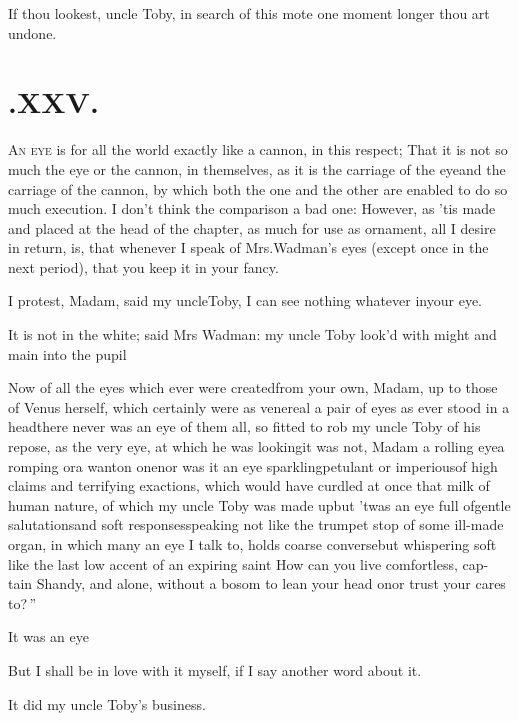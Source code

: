\documentclass{article}
\begin{document}
\tsh If thou lookest, uncle Toby, in\break
search of this mote one moment longer\break
\tsh thou art undone.


\section{.\enspace XXV.}

\lettrine{A}{n eye} is for all the world exactly like a cannon, in this respect;
That it is not so much the eye or the cannon, in themselves, as it is the carriage
of the eye\tsh and the carriage of the cannon, by which both the one and the other
are enabled to do so much execution. I don’t think the comparison a bad one:
However, as ’tis made and placed at the head of the chapter, as much for use as
ornament, all I desire in return, is, that whenever I speak of Mrs.\@ Wadman’s eyes
(except once in the next period), that you keep it in your fancy.

I protest, Madam, said my uncle\break Toby, I can see nothing
whatever in\break your eye.

It is not in the white; said Mrs Wadman: my uncle
Toby look’d with might and main into the
pupil\tsh

Now of all the eyes which ever were created\tsh from
your own, Madam, up to those of Venus herself, which
certainly were as venereal a pair of eyes as ever stood in a
head\tsh there never was an eye of them all, so fitted to
rob my uncle Toby of his repose, as the very eye, at which
he was looking\tsh it was not, Madam a rolling
eye\tsh a romping or\break a wanton one\tsk nor was it an eye
spark\-ling\tsk petulant or imperious\tsk of high claims and
terrifying exactions, which would have curdled at once that milk of human
nature, of which my uncle Toby was made up\tsh but
’twas an eye full of\break gentle salutations\tsh and soft
responses\break\tsh speaking \tsh not like the trumpet\break
stop of some ill-made organ, in which many an eye I talk to, holds
coarse converse\tsh but whispering soft \tsh like
the last low accent of an expiring
saint\tsh\break 
\lqq How can you live comfortless, cap-\break
\lqq tain Shandy, and alone, without a\break
\lqq bosom to lean your head on\tsh or\break
\lqq trust your cares to?\,”

It was an eye\tsh

But I shall be in love with it myself,\break
if I say another word about it.

\tsh It did my uncle Toby’s business.
\end{document}
